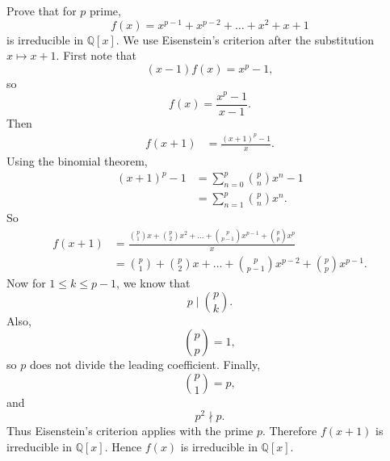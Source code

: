 \begin{problem}{
    Prove that for $p$ prime,
    \[
        f(x)=x^{p-1}+x^{p-2}+\dots+x^2+x+1
    \]
    is irreducible in $\mathbb{Q}[x]$.
}
    We use Eisenstein's criterion after the substitution $x\mapsto x+1$.
    First note that
    \[
        (x-1)f(x)=x^p-1,
    \]
    so
    \[
        f(x)=\frac{x^p-1}{x-1}.
    \]
    Then
    \begin{align*}
        f(x+1)
        &=
        \frac{(x+1)^p-1}{x}.
    \end{align*}
    Using the binomial theorem,
    \begin{align*}
        (x+1)^p-1
        &=
        \sum_{n=0}^p \binom{p}{n}x^n-1\\
        &=
        \sum_{n=1}^p \binom{p}{n}x^n.
    \end{align*}
    So
    \begin{align*}
        f(x+1)
        &=
        \frac{\binom{p}{1}x+\binom{p}{2}x^2+\dots+\binom{p}{p-1}x^{p-1}+\binom{p}{p}x^p}{x}\\
        &=
        \binom{p}{1}+\binom{p}{2}x+\dots+\binom{p}{p-1}x^{p-2}+\binom{p}{p}x^{p-1}.
    \end{align*}
    Now for $1\leq k\leq p-1$, we know that
    \[
        p\mid \binom{p}{k}.
    \]
    Also,
    \[
        \binom{p}{p}=1,
    \]
    so $p$ does not divide the leading coefficient.
    Finally,
    \[
        \binom{p}{1}=p,
    \]
    and
    \[
        p^2\nmid p.
    \]
    Thus Eisenstein's criterion applies with the prime $p$.
    Therefore $f(x+1)$ is irreducible in $\mathbb{Q}[x]$.
    Hence $f(x)$ is irreducible in $\mathbb{Q}[x]$.
\end{problem}